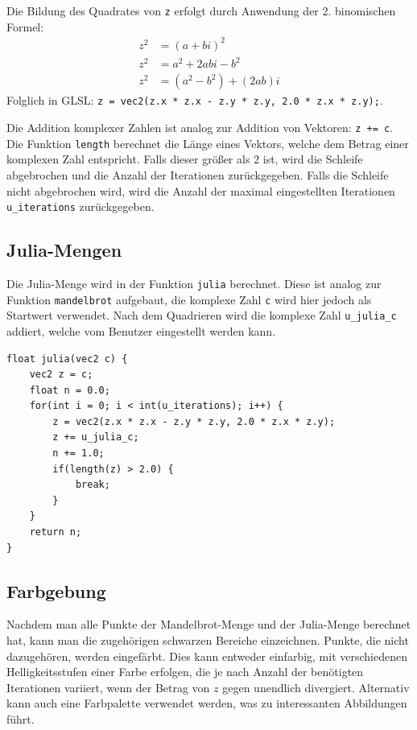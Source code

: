 \noindent
Die Bildung des Quadrates von \texttt{z} erfolgt durch Anwendung der 2.
binomischen Formel:
\begin{align*}
    z^2 & = (a+bi)^2             \\
    z^2 & = a^2 + 2abi - b^2     \\
    z^2 & = (a^2 - b^2) + (2ab)i
\end{align*}
Folglich in GLSL:
\texttt{z = vec2(z.x * z.x - z.y * z.y, 2.0 * z.x * z.y);}.
\hfill \break

\noindent
Die Addition komplexer Zahlen ist analog zur Addition von Vektoren: \texttt{z
    += c}. \hfill \break \newline Die Funktion \texttt{length} berechnet die Länge
eines Vektors, welche dem Betrag einer komplexen Zahl entspricht. Falls dieser
größer als 2 ist, wird die Schleife abgebrochen und die Anzahl der Iterationen
zurückgegeben. \newline Falls die Schleife nicht abgebrochen wird, wird die
Anzahl der maximal eingestellten Iterationen \texttt{u\_iterations}
zurückgegeben.

\subsection{Julia-Mengen}
Die Julia-Menge wird in der Funktion \texttt{julia} berechnet. Diese ist analog
zur Funktion \texttt{mandelbrot} aufgebaut, die komplexe Zahl \texttt{c} wird
hier jedoch als Startwert verwendet. Nach dem Quadrieren wird die komplexe Zahl
\texttt{u\_julia\_c} addiert, welche vom Benutzer eingestellt werden kann.
\begin{verbatim}
float julia(vec2 c) {
    vec2 z = c;
    float n = 0.0;
    for(int i = 0; i < int(u_iterations); i++) {
        z = vec2(z.x * z.x - z.y * z.y, 2.0 * z.x * z.y);
        z += u_julia_c;
        n += 1.0;
        if(length(z) > 2.0) {
            break;
        }
    }
    return n;
}
\end{verbatim}

\subsection{Farbgebung}
Nachdem man alle Punkte der Mandelbrot-Menge und der Julia-Menge berechnet hat,
kann man die zugehörigen schwarzen Bereiche einzeichnen. Punkte, die nicht
dazugehören, werden eingefärbt. Dies kann entweder einfarbig, mit verschiedenen
Helligkeitsstufen einer Farbe erfolgen, die je nach Anzahl der benötigten
Iterationen variiert, wenn der Betrag von $z$ gegen unendlich divergiert.
Alternativ kann auch eine Farbpalette verwendet werden, was zu interessanten
Abbildungen führt.

